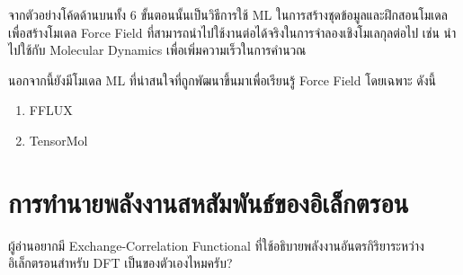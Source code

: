 \vspace{1em}

จากตัวอย่างโค้ดด้านบนทั้ง 6 ขั้นตอนนั้นเป็นวิธีการใช้ ML ในการสร้างชุดข้อมูลและฝึกสอนโมเดลเพื่อสร้างโมเดล Force Field ที่สามารถนำไปใช้งานต่อได้จริงในการจำลองเชิงโมเลกุลต่อไป เช่น นำไปใช้กับ Molecular Dynamics เพื่อเพิ่มความเร็วในการคำนวณ

นอกจากนี้ยังมีโมเดล ML ที่น่าสนใจที่ถูกพัฒนาขึ้นมาเพื่อเรียนรู้ Force Field โดยเฉพาะ ดังนี้
%
\begin{enumerate}[topsep=0pt,noitemsep]\setlength\itemsep{0.5em}
    \item FFLUX\autocite{hughes2019}

    \item TensorMol\autocite{yao2018}
\end{enumerate}

\section{การทำนายพลังงานสหสัมพันธ์ของอิเล็กตรอน}
\label{sec:pred_corre_ener}

\begin{framed}
    ผู้อ่านอยากมี Exchange-Correlation Functional ที่ใช้อธิบายพลังงานอันตรกิริยาระหว่างอิเล็กตรอนสำหรับ DFT เป็นของตัวเองไหมครับ?
\end{framed}

